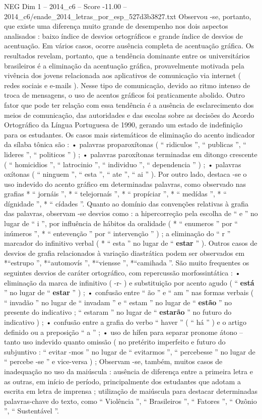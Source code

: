 \begin{textsample}{NEG Dim 1 – 2014\_c6 – Score -11.00 – 2014\_c6/enade\_2014\_letras\_por\_esp\_527d3b3827.txt}
Observou -se, portanto, que existe uma diferença muito grande de desempenho nos dois aspectos analisados : baixo índice de desvios ortográficos e grande índice de desvios de acentuação.
Em vários casos, ocorre ausência completa de acentuação gráfica.
Os resultados revelam, portanto, que a tendência dominante entre os universitários brasileiros é a eliminação da acentuação gráfica, provavelmente motivada pela vivência dos jovens relacionada aos aplicativos de comunicação via internet ( redes sociais e e-mails ).
Nesse tipo de comunicação, devido ao ritmo intenso de troca de mensagens, o uso de acentos gráficos foi praticamente abolido.
Outro fator que pode ter relação com essa tendência é a ausência de esclarecimento dos meios de comunicação, das autoridades e das escolas sobre as decisões do Acordo Ortográfico da Língua Portuguesa de 1990, gerando um estado de indefinição para os estudantes.
Os casos mais sistemáticos de eliminação do acento indicador da sílaba tônica são : • palavras proparoxítonas ( “ ridiculos ”, “ publicas ”, “ lideres ”, “ politicos ” ) ; • palavras paroxítonas terminadas em ditongo crescente ( “ homicidios ”, “ latrocinio ”, “ individuo ”, “ dependencia ” ) ; • palavras oxítonas ( “ ninguem ”, “ esta ”, “ ate ”, “ ai ” ).
Por outro lado, destaca -se o uso indevido do acento gráfico em determinadas palavras, como observado nas grafias * “ jornáis ”, * “ telejornaís ”, * “ propíciar ”, * “ medídas ”, * “ dígnidade ”, * “ cídades ”.
Quanto ao domínio das convenções relativas à grafia das palavras, observam -se desvios como : a hipercorreção pela escolha de “ e ” no lugar de “ i ”, por influência de hábitos da oralidade ( * “ enumeros ” por “ inúmeros ”, * “ entevenção ” por “ intervenção ” ) ; a eliminação do “ r ” marcador do infinitivo verbal ( * “ esta ” no lugar de “ \textbf{estar} ” ).
Outros casos de desvios de grafia relacionados à variação diastrática podem ser observados em *“estrupo ”, *“automovís ”, *“viensse ”, *“camihada ”.
São muito frequentes os seguintes desvios de caráter ortográfico, com repercussão morfossintática : • eliminação da marca de infinitivo ( -r- ) e substituição por acento agudo ( “ \textbf{está} ” no lugar de “ \textbf{estar} ” ) ; • confusão entre “ ão ” e “ am ” nas formas verbais ( “ invadão ” no lugar de “ invadam ” e “ estam ” no lugar de “ \textbf{estão} ” no presente do indicativo ; “ estaram ” no lugar de “ \textbf{estarão} ” no futuro do indicativo ) ; • confusão entre a grafia do verbo “ haver ” ( “ há ” ) e o artigo definido ou a preposição “ a ” ; • uso de hífen para separar pronome átono – tanto uso indevido quanto omissão ( no pretérito imperfeito e futuro do subjuntivo : “ evitar -mos ” no lugar de “ evitarmos ”, “ percebesse ” no lugar de “ percebe -se ” e vice-versa ) ; Observam -se, também, muitos casos de inadequação no uso da maiúscula : ausência de diferença entre a primeira letra e as outras, em início de período, principalmente dos estudantes que adotam a escrita em letra de imprensa ; utilização de maiúscula para destacar determinadas palavras-chave do texto, como “ Violência ”, “ Brasileiros ”, “ Fatores ”, “ Ozônio ”, “ Sustentável ”.

\end{textsample}
